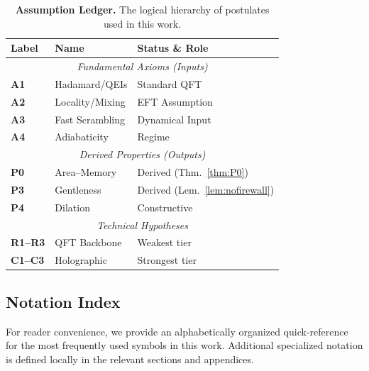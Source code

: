\documentclass[aps,prd,preprint,onecolumn,superscriptaddress,nofootinbib,longbibliography,floatfix,11pt,showpacs,showkeys]{revtex4-2}
\theoremstyle{plain}
\theoremstyle{definition}
\theoremstyle{remark}
\begin{document}
\begin{table}[h!]
\centering
\caption{\textbf{Assumption Ledger.} The logical hierarchy of postulates used in this work.}
\label{tab:assumption_ledger}
\small
\begin{tabular*}{\textwidth}{@{\extracolsep{\fill}}lll@{}}
\toprule
\textbf{Label} & \textbf{Name} & \textbf{Status \& Role} \\
\midrule
\multicolumn{3}{c}{\textit{Fundamental Axioms (Inputs)}} \\
\midrule
\textbf{A1} & Hadamard/QEIs & Standard QFT \\
\textbf{A2} & Locality/Mixing & EFT Assumption \\
\textbf{A3} & Fast Scrambling & Dynamical Input \\
\textbf{A4} & Adiabaticity & Regime \\
\midrule
\multicolumn{3}{c}{\textit{Derived Properties (Outputs)}} \\
\midrule
\textbf{P0} & Area--Memory & Derived (Thm.~\ref{thm:P0}) \\
\textbf{P3} & Gentleness & Derived (Lem.~\ref{lem:nofirewall}) \\
\textbf{P4} & Dilation & Constructive \\
\midrule
\multicolumn{3}{c}{\textit{Technical Hypotheses}} \\
\midrule
\textbf{R1--R3} & QFT Backbone & Weakest tier \\
\textbf{C1--C3} & Holographic & Strongest tier \\
\bottomrule
\end{tabular*}
\end{table}

\subsection{Notation Index}
For reader convenience, we provide an alphabetically organized quick-reference for the most frequently used symbols in this work. Additional specialized notation is defined locally in the relevant sections and appendices.
\end{document}
